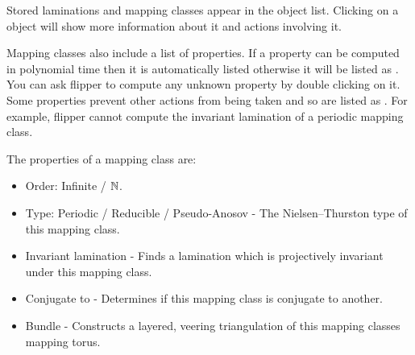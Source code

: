 \documentclass[a4paper]{article}
\newcommand{\exc}[1]{\mbox{\PVerb{#1}}}
\begin{document}
Stored laminations and mapping classes appear in the object list. Clicking on a object will show more information about it and actions involving it.

Mapping classes also include a list of properties. If a property can be computed in polynomial time then it is automatically listed otherwise it will be listed as \exc{?}. You can ask flipper to compute any unknown property by double clicking on it. Some properties prevent other actions from being taken and so are listed as \exc{x}. For example, flipper cannot compute the invariant lamination of a periodic mapping class.

The properties of a mapping class are:
\begin{itemize}
\item Order: Infinite / $\mathbb{N}$.
\item Type: Periodic / Reducible / Pseudo-Anosov - The Nielsen--Thurston type of this mapping class.
\item Invariant lamination - Finds a lamination which is projectively invariant under this mapping class.
\item Conjugate to - Determines if this mapping class is conjugate to another.
\item Bundle - Constructs a layered, veering triangulation of this mapping classes mapping torus.
\end{itemize}






\end{document}
